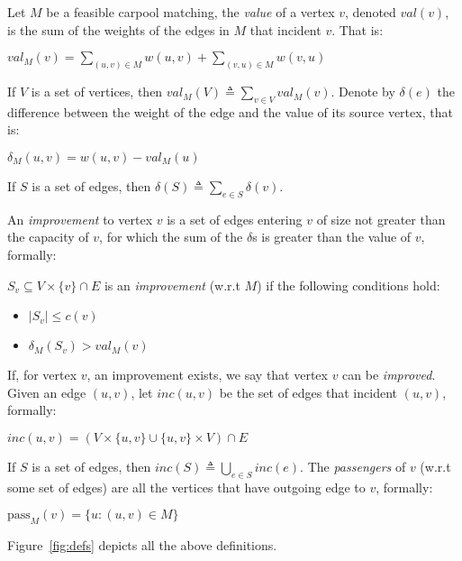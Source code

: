 
Let $M$ be a feasible carpool matching,
the \emph{value} of a vertex $v$, denoted $val(v)$, 
is the sum of the weights of the edges in $M$ that incident $v$. 
That is: 
%
\begin{definition}[$val$]
$val_M(v) = \sum_{(u, v) \in M} w(u, v) + \sum_{(v, u) \in M} w(v, u)$
\end{definition}
%
If $V$ is a set of vertices, then $val_M(V) \triangleq \sum_{v \in V} val_M(v)$.
%
Denote by $\delta(e)$ the difference between the weight of the edge and the value
of its source vertex,
that is:
%
\begin{definition}[$\delta$]
$\delta_M(u, v) = w(u, v) - val_M(u)$
\end{definition}
%
If $S$ is a set of edges, then $\delta(S) \triangleq \sum_{e \in S}\delta(v)$.

An \emph{improvement} to vertex $v$ 
is a set of edges entering $v$ of size not greater than the capacity of $v$, 
for which the sum of the $\delta$s is greater than the value of $v$,
formally: 

\begin{definition}[improvement]
$S_v \subseteq V \times \{v\} \cap E$ is an \emph{improvement} (w.r.t $M$)
if the following conditions hold:
\begin{itemize}
\item
$|S_v| \leq c(v)$
\item
$\delta_M(S_v) > val_M(v)$
\end{itemize}  
\end{definition}
%
If, for vertex $v$, an improvement exists, we say that vertex $v$ can be \emph{improved}.
%
Given an edge $(u,v)$, 
let $inc(u,v)$ be the set of edges that incident $(u, v)$,
formally:
%
\begin{definition}[inc]
$inc(u,v) = (V \times \{u, v\} \cup \{u, v\} \times V) \cap E$
\end{definition}
%
If $S$ is a set of edges, then $inc(S) \triangleq \bigcup_{e \in S} inc(e)$.
%
The \emph{passengers} of $v$ (w.r.t some set of edges) are all the vertices that have
outgoing edge to $v$, formally: 
%
\begin{definition}[passengers]
$\text{pass}_M(v) = \{u : (u, v) \in M\}$
\end{definition}
%
Figure~\ref{fig:defs} depicts all the above definitions.

